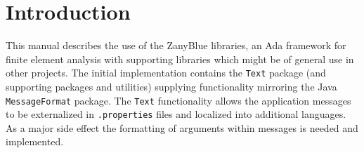 %
%
%
%
%
%
%
%

\chapter{Introduction}

This manual describes the use of the ZanyBlue libraries, an Ada framework for
finite element analysis with supporting libraries which might be of general
use in other projects.  The initial implementation contains the \texttt{Text}
package (and supporting packages and utilities) supplying functionality
mirroring the Java \texttt{MessageFormat} package.  The \texttt{Text}
functionality allows the application messages to be externalized in
\texttt{.properties} files and localized into additional languages.  As a
major side effect the formatting of arguments within messages is needed and
implemented.

